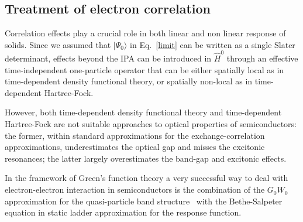 \subsection{Treatment of electron correlation}\label{ss:correff}
Correlation effects play a crucial role in both linear\cite{Onida} and non linear\cite{PhysRevB.82.235201,PhysRevB.80.155205} response of solids. %
Since we assumed that $|\Psi_0\rangle$ in Eq.~\eqref{limit} can be written as a single Slater determinant, effects beyond the IPA can be introduced in $\hat H^0$ through an effective time-independent one-particle operator that can be either spatially local as in time-dependent density functional theory, or spatially non-local as in time-dependent Hartree-Fock. 

However, both time-dependent density functional theory and time-dependent Hartree-Fock are not suitable approaches to optical properties of semiconductors: the former, within standard approximations for the exchange-correlation approximations, underestimates the optical gap and misses the excitonic resonances; the latter largely overestimates the band-gap and excitonic effects.   

In the framework of Green's function theory a very successful way to deal with electron-electron interaction in semiconductors is the combination of the $G_0W_0$ approximation for the quasi-particle band structure~\cite{PhysRevB.25.2867} with the Bethe-Salpeter equation in static ladder approximation for the response function.~\cite{strinati}  

